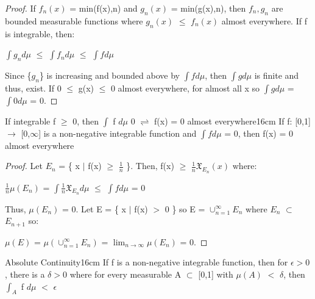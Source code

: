     \begin{proof}
        If $f_n(x)$ = min(f(x),n) and $g_n(x)$ = min(g(x),n),
        then $f_n,g_n$ are bounded measurable functions
        where $g_n(x)$ $\leq$ $f_n(x)$ almost everywhere.
        If f is integrable, then:

        \hspace{0.5cm}
        $\int g_n d\mu$
        $\leq$ $\int f_n d\mu$
        $\leq$ $\int f d\mu$

        Since \{$g_n$\} is increasing and bounded above by $\int f d\mu$,
        then $\int g d\mu$ is finite and thus, exist.
        If 0 $\leq$ g(x) $\leq$ 0 almost everywhere,
        for almost all x so $\int g d\mu$ = $\int 0 d\mu$ = 0.
    \end{proof}

    \vspace{0.5cm}



    \begin{corollary}{If integrable f $\geq$ 0, then
    $\int$ f $d\mu$ 0 $\rightleftharpoons$ f(x) = 0 almost everywhere}{16cm}
        If f: [0,1] $\rightarrow$ [0,$\infty$] is a non-negative integrable
        function and $\int f d\mu$ = 0, then f(x) = 0 almost everywhere
    \end{corollary}

    \begin{proof}
        Let $E_n$ = \{ x $|$ f(x) $\geq$ $\frac{1}{n}$ \}.
        Then, f(x) $\geq$ $\frac{1}{n} \mathfrak{X}_{E_n}(x)$ where:

        \hspace{0.5cm}
        $\frac{1}{n} \mu(E_n)$
        = $\int \frac{1}{n} \mathfrak{X}_{E_n} d\mu$
        $\leq$ $\int f d\mu$
        = 0

        Thus, $\mu(E_n)$ = 0.
        Let E = \{ x $|$ f(x) $>$ 0 \}
        so E = $\cup_{n=1}^{\infty} E_n$ where $E_n$ $\subset$ $E_{n+1}$ so:

        \hspace{0.5cm}
        $\mu(E)$
        = $\mu(\cup_{n=1}^{\infty} E_n)$
        = $\lim_{n \rightarrow \infty} \mu(E_n)$
        = 0.
    \end{proof}

    \newpage



    \begin{wtheorem}{Absolute Continuity}{16cm}
        If f is a non-negative integrable function, then for $\epsilon > 0$,
        there is a $\delta > 0$ where for every measurable A $\subset$ [0,1]
        with $\mu(A)$ $<$ $\delta$, then $\int_A$ f $d\mu$ $<$ $\epsilon$
    \end{wtheorem}

